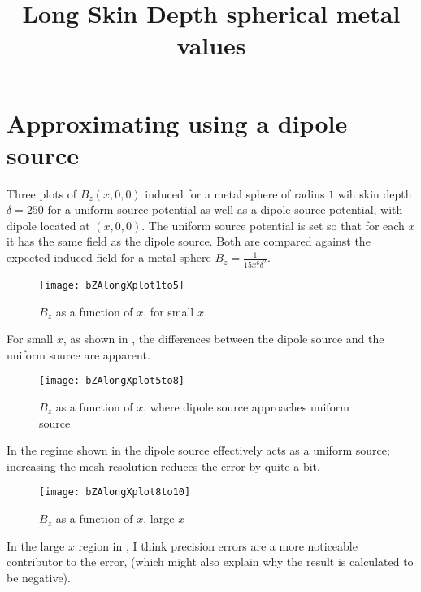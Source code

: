 \documentclass[11pt]{article}
\title{Long Skin Depth spherical metal values}
\date{}
\author{}
\begin{document}
\graphicspath{{figures/}}

\maketitle

\section{Approximating using a dipole source}\label{sec:spheredipolesource}

Three plots of $B_z(x, 0, 0)$ induced for a metal sphere of radius $1$ wih skin depth $\delta = 250$ for a uniform source potential as well
as a dipole source potential, with dipole located at $(x, 0, 0)$.
The uniform source potential is set so that for each $x$ it has the same field as the dipole source.
Both are compared against the expected induced field for a metal sphere $B_z = \frac{1}{15 x^6 \delta^2}$.

\begin{figure}[htp]
	\centering
	\texttt{[image: bZAlongXplot1to5]}
	\caption{$B_z$ as a function of $x$, for small $x$ \label{fig:bZZplotx1to5}}
\end{figure}

For small $x$, as shown in , the differences between the dipole source and the uniform source are
apparent.

\begin{figure}[htp]
	\centering
	\texttt{[image: bZAlongXplot5to8]}
	\caption{$B_z$ as a function of $x$, where dipole source approaches uniform source \label{fig:bZZplotx5to8}}
\end{figure}

In the regime shown in  the dipole source effectively acts as a uniform source;
increasing the mesh resolution reduces the error by quite a bit.

\begin{figure}[htp]
	\centering
	\texttt{[image: bZAlongXplot8to10]}
	\caption{$B_z$ as a function of $x$, large $x$ \label{fig:bZZplotx8to10}}
\end{figure}

In the large $x$ region in , I think precision errors are a more noticeable contributor to the
error, (which might also explain why the result is calculated to be negative).
\end{document}
